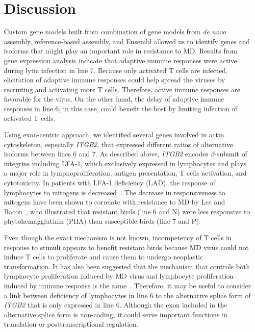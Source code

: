 \documentclass[10pt]{article}
\begin{document}
\section*{Discussion}

Custom gene models built from combination of gene models from {\em de novo}
assembly, reference-based assembly, and Ensembl allowed us to identify genes and
isoforms that might play an important role in resistance to MD.  Results from
gene expression analysis indicate that adaptive immune responses were active
during lytic infection in line 7.  Because only activated T cells are infected,
elicitation of adaptive immune responses could help spread the viruses by
recruiting and activating more T cells.  Therefore, active immune responses are
favorable for the virus.  On the other hand, the delay of adaptive immune
responses in line 6, in this case, could benefit the host by limiting infection
of activated T cells.

Using exon-centric approach, we identified several genes involved in actin
cytoskeleton, especially {\em ITGB2}, that expressed different ratios of
alternative isoforms between lines 6 and 7.  As described above, {\em ITGB2}
encodes $\beta$-subunit of integrins including LFA-1, which exclusively
expressed in lymphocytes and plays a major role in lymphoproliferation, antigen
presentation, T cells activation, and cytotoxicity.  In patients with LFA-1
deficiency (LAD), the response of lymphocytes to mitogens is
decreased~\cite{springer1987lymphocyte}.  The decrease in responsiveness to
mitogens have been shown to correlate with resistance to MD by Lee and
Bacon~\cite{lee1983ontogeny}, who illustrated that resistant birds (line 6 and
N) were less responsive to phytohemagglutinin (PHA) than susceptible birds (line
7 and P).

Even though the exact mechanism is not known, incompetency of T cells in
response to stimuli appears to benefit resistant birds because MD virus could
not induce T cells to proliferate and cause them to undergo neoplastic
transformation.  It has also been suggested that the mechanism that controls
both lymphocyte proliferation induced by MD virus and lymphocyte proliferation
induced by immune response is the same~\cite{pazderka1975histocompatibility}.
Therefore, it may be useful to consider a link between deficiency of lymphocytes
in line 6 to the alternative splice form of {\em ITGB2} that is only expressed
in line 6.  Although the exon included in the alternative splice form is
non-coding, it could serve important functions in translation or
posttranscriptional regulation.
\end{document}
